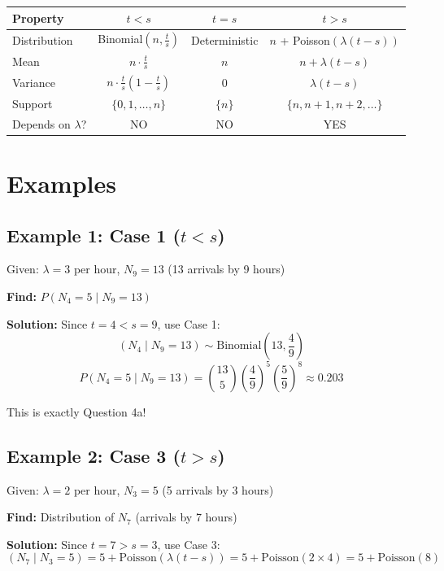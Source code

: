\documentclass[11pt]{article}
\begin{document}
\begin{table}[h]
\centering
\begin{tabular}{|l|c|c|c|}
\hline
\textbf{Property} & \textbf{$t < s$} & \textbf{$t = s$} & \textbf{$t > s$} \\
\hline
Distribution & Binomial$(n, \frac{t}{s})$ & Deterministic & $n$ + Poisson$(\lambda(t-s))$ \\
\hline
Mean & $n \cdot \frac{t}{s}$ & $n$ & $n + \lambda(t-s)$ \\
\hline
Variance & $n \cdot \frac{t}{s}(1-\frac{t}{s})$ & $0$ & $\lambda(t-s)$ \\
\hline
Support & $\{0, 1, \ldots, n\}$ & $\{n\}$ & $\{n, n+1, n+2, \ldots\}$ \\
\hline
Depends on $\lambda$? & NO & NO & YES \\
\hline
\end{tabular}
\end{table}

\section{Examples}

\subsection{Example 1: Case 1 ($t < s$)}

Given: $\lambda = 3$ per hour, $N_9 = 13$ (13 arrivals by 9 hours)

\textbf{Find:} $P(N_4 = 5 \mid N_9 = 13)$

\textbf{Solution:} Since $t = 4 < s = 9$, use Case 1:
\[
(N_4 \mid N_9 = 13) \sim \text{Binomial}\left(13, \frac{4}{9}\right)
\]
\[
P(N_4 = 5 \mid N_9 = 13) = \binom{13}{5}\left(\frac{4}{9}\right)^5\left(\frac{5}{9}\right)^8 \approx 0.203
\]

This is exactly Question 4a!

\subsection{Example 2: Case 3 ($t > s$)}

Given: $\lambda = 2$ per hour, $N_3 = 5$ (5 arrivals by 3 hours)

\textbf{Find:} Distribution of $N_7$ (arrivals by 7 hours)

\textbf{Solution:} Since $t = 7 > s = 3$, use Case 3:
\[
(N_7 \mid N_3 = 5) = 5 + \text{Poisson}(\lambda(t-s)) = 5 + \text{Poisson}(2 \times 4) = 5 + \text{Poisson}(8)
\]
\end{document}
